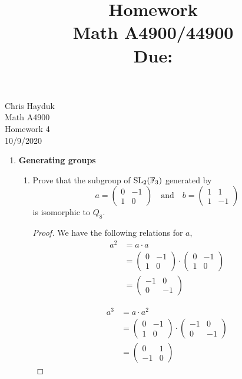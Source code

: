 \documentclass[11pt, reqno]{amsart}
\title[Homework \HW]{Homework \HW \\
Math A4900/44900\\
\small Due: \DUE}
\author{}
\theoremstyle{plain}
\theoremstyle{definition}
\theoremstyle{example}
\def\HW{4}
\def\DUE{10/9/2020}
\begin{document}
\begin{flushright}
Chris Hayduk\\
Math A4900\\
Homework \HW\\
\DUE
\end{flushright}





\begin{enumerate}[1.]
\item {\bf Generating groups}
\begin{enumerate}
\item Prove that the subgroup of $\mathrm{SL}_2(\mathbb{F}_3)$ generated by 
$$a = \begin{pmatrix} 0 & -1 \\ 1 & 0 \end{pmatrix} \quad \text{and} \quad 
		b = \begin{pmatrix} 1 & 1 \\ 1 & -1 \end{pmatrix}$$
is isomorphic to $Q_8$.

\begin{proof}
We have the following relations for $a$,
\begin{align*}
a^2 &= a \cdot a\\
&= \begin{pmatrix} 0 & -1 \\ 1 & 0 \end{pmatrix} \cdot \begin{pmatrix} 0 & -1 \\ 1 & 0 \end{pmatrix}\\
&= \begin{pmatrix} -1 & 0 \\ 0 & -1 \end{pmatrix}
\end{align*}

\begin{align*}
a^3 &= a \cdot a^2\\
&= \begin{pmatrix} 0 & -1 \\ 1 & 0 \end{pmatrix} \cdot \begin{pmatrix} -1 & 0 \\ 0 & -1 \end{pmatrix}\\
&= \begin{pmatrix} 0 & 1 \\ -1 & 0 \end{pmatrix} 
\end{align*}


\end{proof}
\end{enumerate}
\end{enumerate}
\end{document}
